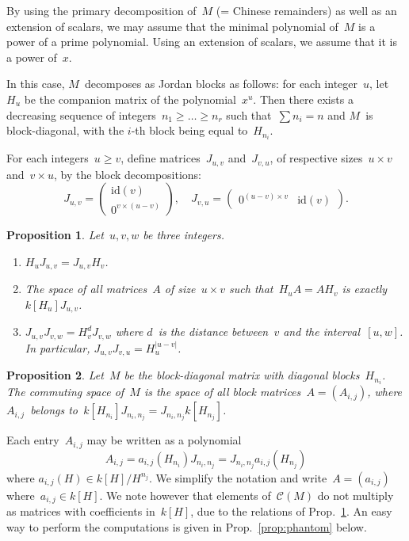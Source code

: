 \documentclass{article}%
\newtheorem{prop}{Proposition}
\let\ro\mathscr
\def\abs#1{\left|#1\right|}
\def\mat#1{\begin{pmatrix}#1\end{pmatrix}}
\begin{document}
By using the primary decomposition of~$M$ (= Chinese remainders) as well
as an extension of scalars, we may assume that the minimal polynomial
of~$M$ is a power of a prime polynomial. Using an extension of scalars, we
assume that it is a power of~$x$.

In this case, $M$~decomposes as Jordan blocks as follows: for each
integer~$u$, let~$H_u$ be the companion matrix of the polynomial~$x^u$.
Then there exists a decreasing sequence of integers~$n_1 ≥ … ≥ n_r$ such
that~$∑ n_i = n$ and $M$~is block-diagonal, with the $i$-th block being
equal to~$H_{n_i}$.

For each integers~$u ≥ v$, define matrices~$J_{u,v}$ and~$J_{v,u}$, of
respective sizes~$u × v$ and~$v × u$, by the block decompositions:
\begin{equation}
J_{u,v} = \mat{ \mathrm{id}(v) \\ 0^{v ×(u-v)}},\quad
J_{v,u} = \mat{ 0^{(u-v)× v } & \mathrm{id}(v)}.
\end{equation}

\begin{prop}\label{prop:rel-HJ}
Let~$u, v, w$ be three integers.
\begin{enumerate}
\item $H_{u} J_{u,v} = J_{u,v} H_{v}$.
\item The space of all matrices~$A$ of size~$u × v$ such that~$H_u A = A
H_v$ is exactly $k[H_u] J_{u,v}$.
\item \label{it:Juw} $J_{u,v} J_{v,w} = H_v^{d} J_{v,w}^{}$ where $d$~is
the distance between~$v$ and the interval~$[u,w]$. In particular,
$J_{u,v} J_{v,u} = H_{u}^{\abs{u-v}}$.
\end{enumerate}
\end{prop}

\begin{prop}\label{prop:structure-commutant}
Let~$M$ be the block-diagonal matrix with diagonal blocks~$H_{n_i}$.
The commuting space of~$M$ is the space of
all block matrices~$A = (A_{i,j})$, where $A_{i,j}$~belongs
to~$k[H_{n_i}] J_{n_{i}, n_{j}} = J_{n_i, n_j} k[H_{n_j}]$.
\end{prop}

Each entry~$A_{i,j}$ may be written as a polynomial
\begin{equation}
A_{i,j} = a_{i,j} (H_{n_i}) J_{n_i,n_j} = J_{n_i,n_j} a_{i,j} (H_{n_j})
\end{equation}
where $a_{i,j}(H) ∈ k[H]/H^{n_j}$.
We simplify the notation and write~$A = (a_{i,j})$ where~$a_{i,j} ∈
k[H]$. We note however that elements of~$\ro C(M)$ do not multiply as
matrices with coefficients in~$k[H]$, due to the relations
of Prop.~\ref{prop:rel-HJ}. An easy way to perform the computations is
given in Prop.~\ref{prop:phantom} below.
\end{document}
